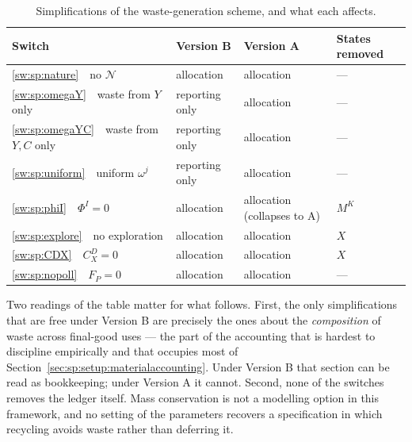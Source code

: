 \begin{table}[H]
\centering
\caption{Simplifications of the waste-generation scheme, and what each affects.}
\label{tab:sp:switches}
\setlength{\tabcolsep}{5pt}
\renewcommand{\arraystretch}{1.05}
\begin{tabular}{@{}p{}p{}p{}p{}@{}}
\toprule
Switch & Version B & Version A & States removed \\
\midrule
\ref{sw:sp:nature}\ \ no $\mathcal N$          & allocation & allocation & --- \\
\ref{sw:sp:omegaY}\ \ waste from $Y$ only      & reporting only & allocation & --- \\
\ref{sw:sp:omegaYC}\ \ waste from $Y,C$ only   & reporting only & allocation & --- \\
\ref{sw:sp:uniform}\ \ uniform $\omega^j$      & reporting only & allocation & --- \\
\ref{sw:sp:phiI}\ \ $\Phi^I=0$                 & allocation & allocation (collapses to A) & $M^K$ \\
\ref{sw:sp:explore}\ \ no exploration          & allocation & allocation & $X$ \\
\ref{sw:sp:CDX}\ \ $C^D_X=0$                   & allocation & allocation & $X$ \\
\ref{sw:sp:nopoll}\ \ $F_P=0$                  & allocation & allocation & --- \\
\bottomrule
\end{tabular}
\end{table}

Two readings of the table matter for what follows. First, the only simplifications that are free
under Version B are precisely the ones about the \emph{composition} of waste across final-good uses
--- the part of the accounting that is hardest to discipline empirically and that occupies most of
Section~\ref{sec:sp:setup:materialaccounting}. Under Version B that section can be read as
bookkeeping; under Version A it cannot. Second, none of the switches removes the ledger itself.
Mass conservation is not a modelling option in this framework, and no setting of the parameters
recovers a specification in which recycling avoids waste rather than deferring it.
